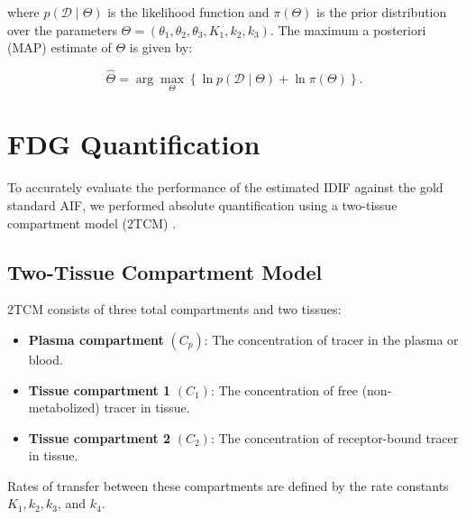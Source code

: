 where \( p(\mathcal{D} \mid \Theta) \) is the likelihood function and \( \pi(\Theta) \) is the prior distribution over the parameters \( \Theta = (\theta_{1}, \theta_{2}, \theta_{3}, K_{1}, k_{2}, k_{3}) \). The maximum a posteriori (MAP) estimate of \( \Theta \) is given by:

\begin{equation}
	\hat{\Theta}
	=
	\arg\max_{\Theta}
	\left\{
	\ln p(\mathcal{D} \mid \Theta)
	+
	\ln \pi(\Theta)
	\right\}.
\end{equation}
%

\section{FDG Quantification}
To accurately evaluate the performance of the estimated IDIF against the gold standard AIF, we performed absolute quantification using a two-tissue compartment model (2TCM) \cite{TODO}.

\subsection{Two-Tissue Compartment Model}
2TCM consists of three total compartments and two tissues:
\begin{itemize}
	\item \textbf{Plasma compartment} \((C_p)\): The concentration of tracer in the plasma or blood.
	\item \textbf{Tissue compartment 1} \((C_1)\): The concentration of free (non-metabolized) tracer in tissue.
	\item \textbf{Tissue compartment 2} \((C_2)\): The concentration of receptor-bound tracer in tissue.
\end{itemize}
Rates of transfer between these compartments are defined by the rate constants \(K_1, k_2, k_3\), and \(k_4\).


